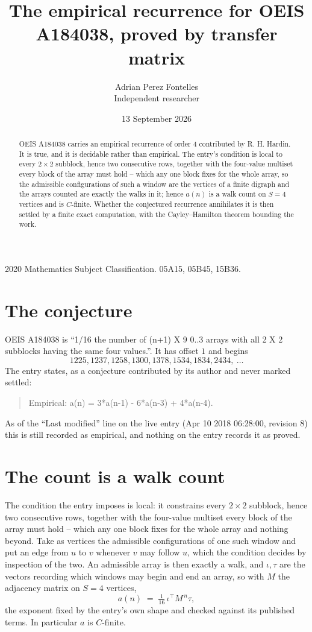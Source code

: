 \documentclass[11pt,a4paper]{article}
\title{The empirical recurrence for OEIS A184038, proved by transfer matrix}
\author{Adrian Perez Fontelles\\ \small Independent researcher}
\date{13 September 2026}
\theoremstyle{plain}
\theoremstyle{definition}
\begin{document}
\maketitle

\begin{abstract}
OEIS A184038 carries an empirical recurrence of order $4$ contributed by R. H. Hardin. It is
true, and it is decidable rather than empirical. The entry's condition is local to every $2\times2$ subblock, hence two consecutive rows, together with the four-value multiset every block of the array must hold -- which any one block fixes for the whole array, so
the admissible configurations of such a window are the vertices of a finite digraph and the
arrays counted are exactly the walks in it; hence $a(n)$ is a walk count on $S=4$ vertices
and is $C$-finite. Whether the conjectured recurrence annihilates it is then settled by a
finite exact computation, with the Cayley--Hamilton theorem bounding the work.
\end{abstract}

\noindent\small 2020 Mathematics Subject Classification. 05A15, 05B45, 15B36.\normalsize

\section{The conjecture}

OEIS A184038 is ``1/16 the number of (n+1) X 9 0..3 arrays with all 2 X 2 subblocks having the same four values.''. It has offset $1$ and begins
\[
1225, 1237, 1258, 1300, 1378, 1534, 1834, 2434,\ \dots
\]
The entry states, as a conjecture contributed by its author and never marked settled:
\begin{quote}
Empirical: a(n) = 3*a(n-1) - 6*a(n-3) + 4*a(n-4).
\end{quote}
As of the ``Last modified'' line on the live entry (Apr 10 2018 06:28:00, revision 8) this is still
recorded as empirical, and nothing on the entry records it as proved.

\section{The count is a walk count}

The condition the entry imposes is local: it constrains every $2\times2$ subblock, hence two consecutive rows, together with the four-value multiset every block of the array must hold -- which any one block fixes for the whole array and nothing beyond. Take as vertices the admissible configurations of one such window and put an edge from $u$ to $v$ whenever $v$ may follow $u$, which the condition decides by inspection of the two.
An admissible array is then exactly a walk, and $\iota,\tau$ are the vectors recording which windows may begin and end an array, so with $M$ the adjacency matrix on $S=4$ vertices,
\[
a(n)\;=\;\tfrac{1}{16}\,\iota^{\!\top}M^{\,n}\tau ,
\]
the exponent fixed by the entry's own shape and checked against its published terms. In
particular $a$ is $C$-finite.
\end{document}
